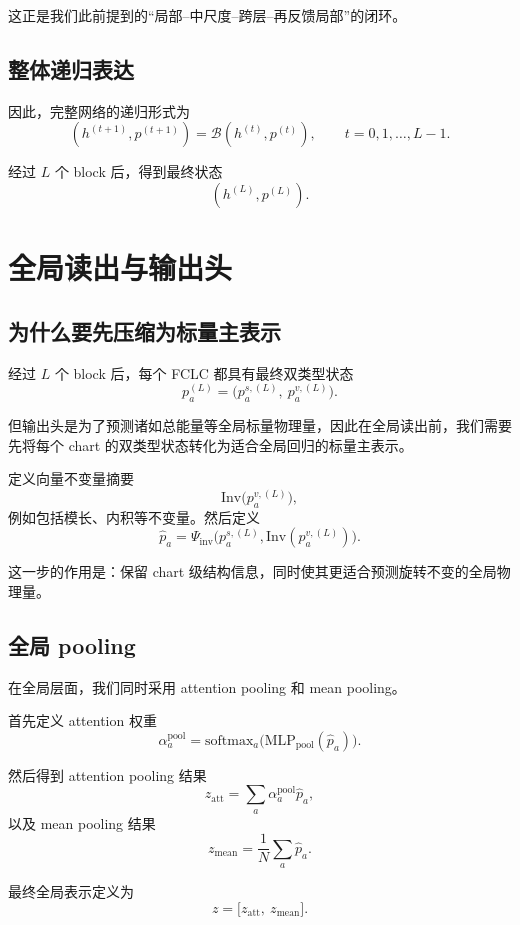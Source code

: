 \documentclass[12pt,a4paper]{ctexart}
\begin{document}
这正是我们此前提到的“局部--中尺度--跨层--再反馈局部”的闭环。

\subsection{整体递归表达}

因此，完整网络的递归形式为
\[
(h^{(t+1)},p^{(t+1)})
=
\mathcal B(h^{(t)},p^{(t)}),
\qquad
t=0,1,\dots,L-1.
\]

经过 \(L\) 个 block 后，得到最终状态
\[
(h^{(L)},p^{(L)}).
\]

\section{全局读出与输出头}

\subsection{为什么要先压缩为标量主表示}

经过 \(L\) 个 block 后，每个 FCLC 都具有最终双类型状态
\[
p_a^{(L)}
=
\big(
p_a^{s,(L)},\
p_a^{v,(L)}
\big).
\]

但输出头是为了预测诸如总能量等全局标量物理量，因此在全局读出前，我们需要先将每个 chart 的双类型状态转化为适合全局回归的标量主表示。

定义向量不变量摘要
\[
\mathrm{Inv}\big(p_a^{v,(L)}\big),
\]
例如包括模长、内积等不变量。然后定义
\[
\hat p_a
=
\Psi_{\mathrm{inv}}
\big(
p_a^{s,(L)},
\mathrm{Inv}(p_a^{v,(L)})
\big).
\]

这一步的作用是：保留 chart 级结构信息，同时使其更适合预测旋转不变的全局物理量。

\subsection{全局 pooling}

在全局层面，我们同时采用 attention pooling 和 mean pooling。

首先定义 attention 权重
\[
\alpha_a^{\mathrm{pool}}
=
\mathrm{softmax}_{a}
\Big(
\mathrm{MLP}_{\mathrm{pool}}(\hat p_a)
\Big).
\]

然后得到 attention pooling 结果
\[
z_{\mathrm{att}}
=
\sum_a \alpha_a^{\mathrm{pool}}\hat p_a,
\]
以及 mean pooling 结果
\[
z_{\mathrm{mean}}
=
\frac1N\sum_a \hat p_a.
\]

最终全局表示定义为
\[
z=
\big[
z_{\mathrm{att}},\
z_{\mathrm{mean}}
\big].
\]
\end{document}
